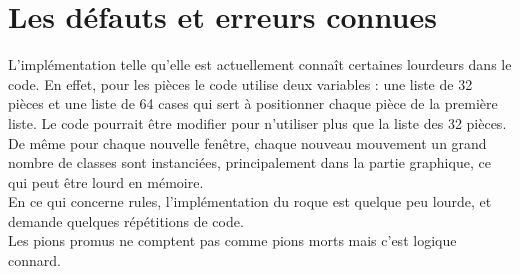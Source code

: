 \documentclass[a4paper]{article}
\begin{document}
\section{Les défauts et erreurs connues}

L'implémentation telle qu'elle est actuellement connaît certaines lourdeurs dans le code. En effet, pour les pièces le code utilise deux variables : une liste de 32 pièces et une liste de 64 cases qui sert à positionner chaque pièce de la première liste. Le code pourrait être modifier pour n'utiliser plus que la liste des 32 pièces. \\

De même pour chaque nouvelle fenêtre, chaque nouveau mouvement un grand nombre de classes sont instanciées, principalement dans la partie graphique, ce qui peut être lourd en mémoire. \\ 

En ce qui concerne rules, l'implémentation du roque est quelque peu lourde, et demande quelques répétitions de code. \\

Les pions promus ne comptent pas comme pions morts mais c'est logique connard.
\end{document}
